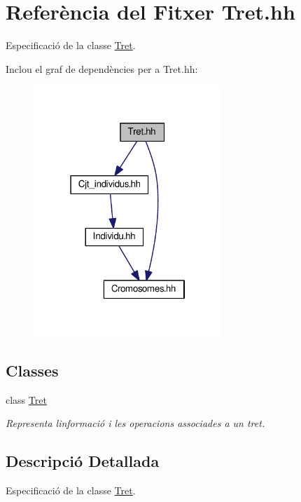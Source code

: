 \hypertarget{_tret_8hh}{}\section{Referència del Fitxer Tret.\+hh}
\label{_tret_8hh}


Especificació de la classe \hyperlink{class_tret}{Tret}.  


Inclou el graf de dependències per a Tret.\+hh\+:
\nopagebreak
\begin{figure}[H]
\begin{center}
\leavevmode
\includegraphics[width=202pt]{_tret_8hh__incl}
\end{center}
\end{figure}
\subsection*{Classes}
\begin{DoxyCompactItemize}
\item 
class \hyperlink{class_tret}{Tret}
\begin{DoxyCompactList}\small\item\em Representa l\textquotesingle{}informació i les operacions associades a un tret. \end{DoxyCompactList}\end{DoxyCompactItemize}


\subsection{Descripció Detallada}
Especificació de la classe \hyperlink{class_tret}{Tret}. 

